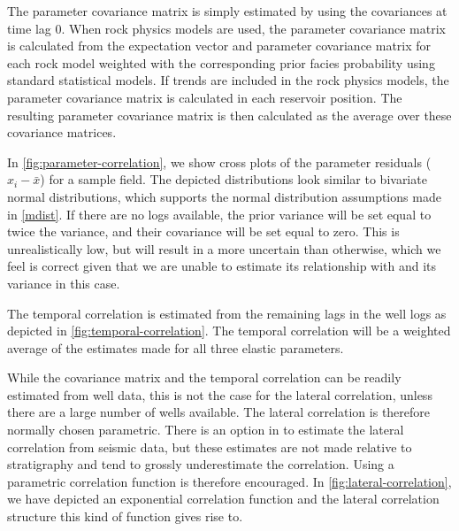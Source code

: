 The parameter covariance matrix is simply estimated by using the
covariances at time lag 0. When rock physics models are used, the parameter covariance matrix is calculated from the expectation vector and parameter covariance matrix for each rock model weighted with the corresponding prior facies probability using standard statistical models. If trends are included in the rock physics models, the parameter covariance matrix is calculated in each reservoir position. The resulting parameter covariance matrix is then calculated as the average over these covariance matrices. 

In \autoref{fig:parameter-correlation}, we
show cross plots of the parameter residuals ($x_i - \bar{x}$) for a
sample field. The depicted distributions look similar to bivariate
normal distributions, which supports the normal distribution
assumptions made in \autoref{mdist}. If there are no \vs logs
available, the prior \vs variance will be set equal to twice the \vp
variance, and their covariance will be set equal to zero. This is 
unrealistically low, but will result in a more uncertain \vp than 
otherwise, which we feel is correct given that we are unable to
estimate its relationship with \vs and its variance in this case.

The temporal correlation is estimated from the remaining lags in the
well logs as depicted in \autoref{fig:temporal-correlation}. The
temporal correlation will be a weighted average of the estimates made
for all three elastic parameters.

While the covariance matrix and the temporal correlation can be readily
estimated from well data, this is not the case for the lateral
correlation, unless there are a large number of wells available. The
lateral correlation is therefore normally chosen parametric. There is
an option in \crava to estimate the lateral correlation from seismic
data, but these estimates are not made relative to stratigraphy and
tend to grossly underestimate the correlation. Using a parametric
correlation function is therefore encouraged. In
\autoref{fig:lateral-correlation}, we have depicted an exponential
correlation function and the lateral correlation structure this kind
of function gives rise to.

